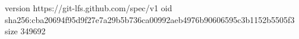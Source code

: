 version https://git-lfs.github.com/spec/v1
oid sha256:cba20694f95d9f27e7a29b5b736ca00992aeb4976b90606595c3b1152b5505f3
size 349692
